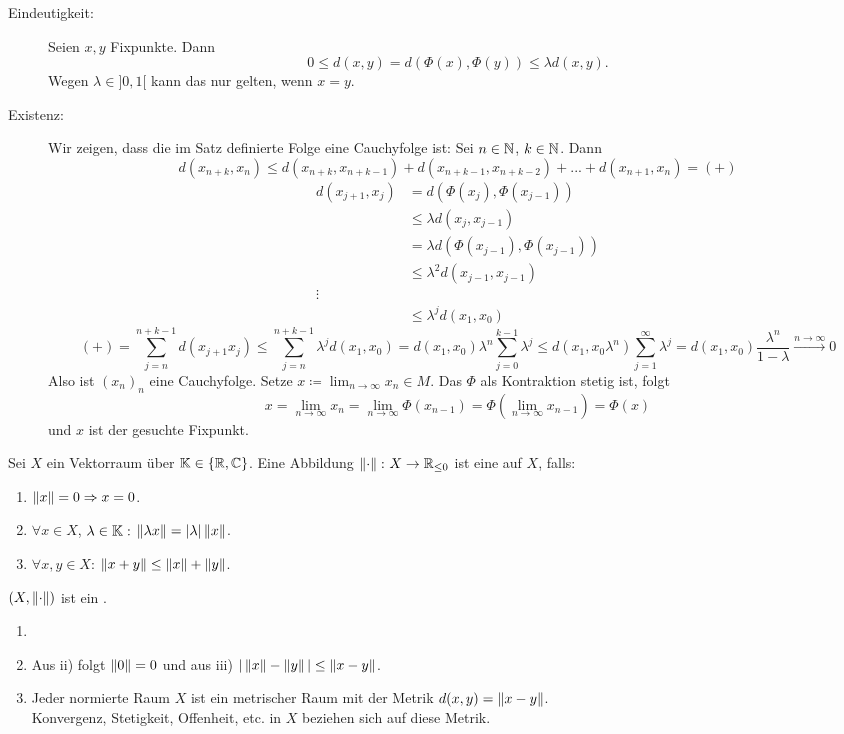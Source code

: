 \begin{beweis}
	\begin{description}
		\item[Eindeutigkeit:] Seien $ x,y $ Fixpunkte. Dann
		\[ 0\leq d(x,y)=d(\Phi(x),\Phi(y))\leq\lambda d(x,y). \]
		Wegen $ \lambda\in]0,1[ $ kann das nur gelten, wenn $ x=y $.
		\item[Existenz:] Wir zeigen, dass die im Satz definierte Folge eine Cauchyfolge ist: Sei $ n\in\mathbb{N} $, $ k\in\mathbb{N} $. Dann
		\[ d(x_{n+k}, x_n)\leq d(x_{n+k}, x_{n+k-1})+d(x_{n+k-1}, x_{n+k-2})+...+d(x_{n+1}, x_n)=(+) \]
		\begin{align*} d(x_{j+1}, x_j)&=d(\Phi(x_{j}),\Phi(x_{j-1}))\\&\leq \lambda d(x_j, x_{j-1})\\&=\lambda d(\Phi(x_{j-1}), \Phi(x_{j-1}))\\&\leq\lambda^2 d(x_{j-1}, x_{j-1})\\\vdots\\&\leq\lambda^j d(x_1,x_0) \end{align*}
		\[ (+)=\sum_{j=n}^{n+k-1}d(x_{j+1}x_j)\leq\sum_{j=n}^{n+k-1}\lambda^j d(x_1,x_0)=d(x_1,x_0)\lambda^n\sum_{j=0}^{k-1}\lambda^j\leq d(x_1,x_0\lambda^n)\sum_{j=1}^{\infty}\lambda^j=d(x_1,x_0)\frac{\lambda^n}{1-\lambda}\xrightarrow{n\to\infty}0 \]
		Also ist $ (x_n)_n $ eine Cauchyfolge. Setze $ x\coloneqq\lim_{n\to\infty}x_n\in M $. Das $ \Phi $ als Kontraktion stetig ist, folgt
		\[ x=\lim_{n\to\infty} x_n=\lim_{n\to\infty}\Phi(x_{n-1})=\Phi(\lim_{n\to\infty}x_{n-1})=\Phi(x) \]
		und $ x $ ist der gesuchte Fixpunkt.
	\end{description}
\end{beweis}
\begin{definition}
	Sei $ X $ ein Vektorraum \"uber $ \mathbb{K}\in\lbrace \mathbb{R},\mathbb{C}\rbrace $. Eine Abbildung $ \left\|\cdot\right\|\colon X\rightarrow\mathbb{R}_{\leq 0} $ ist eine  auf $ X $, falls:
	\begin{enumerate}
		\item $ \left\|x\right\|=0\Rightarrow x=0 $.
		\item $ \forall x\in X $, $ \lambda\in\mathbb{K}: $ $ \left\|\lambda x\right\|=|\lambda|\left\|x\right\| $.
		\item $ \forall x,y\in X $: $ \left\|x+y\right\|\leq\left\|x\right\|+\left\|y\right\| $.
	\end{enumerate}
	$ (X,\left\|\cdot\right\|) $ ist ein .
\end{definition}
\begin{bemerkung}
	\begin{enumerate}
		\item[]
		\item Aus ii) folgt $ \left\|0\right\|=0 $ und aus iii) $ |\left\|x\right\|-\left\|y\right\||\leq\left\|x-y\right\| $.
		\item Jeder normierte Raum $ X $ ist ein metrischer Raum mit der Metrik $ d(x,y)=\left\|x-y\right\| $.\\
		Konvergenz, Stetigkeit, Offenheit, etc. in $ X $ beziehen sich auf diese Metrik.
	\end{enumerate}
\end{bemerkung}
